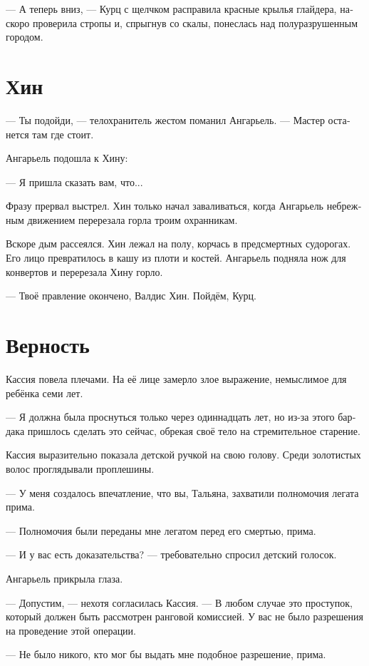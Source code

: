 \documentclass[a4paper,12pt,fleqn]{book}\usepackage{cooltooltips}\usepackage{polyglossia}\setdefaultlanguage[babelshorthands=true]{russian}\setotherlanguage{english}\defaultfontfeatures{Ligatures=TeX,Mapping=tex-text} \usepackage{xcolor}\definecolor{lightgray}{HTML}{bbbbbb}\color{lightgray}\newcommand{\ml}[3]{\textenglish{\textcolor{black}{#3}}}
\begin{document}
--- А теперь вниз, --- Курц с щелчком расправила красные крылья глайдера, наскоро проверила стропы и, спрыгнув со скалы, понеслась над полуразрушенным городом.

\section{Хин}

--- Ты подойди, --- телохранитель жестом поманил Ангарьель.
--- Мастер останется там где стоит.

Ангарьель подошла к Хину:

--- Я пришла сказать вам, что...

Фразу прервал выстрел.
Хин только начал заваливаться, когда Ангарьель небрежным движением перерезала горла троим охранникам.

Вскоре дым рассеялся.
Хин лежал на полу, корчась в предсмертных судорогах.
Его лицо превратилось в кашу из плоти и костей.
Ангарьель подняла нож для конвертов и перерезала Хину горло.

--- Твоё правление окончено, Валдис Хин.
Пойдём, Курц.

\section{Верность}

Кассия повела плечами.
На её лице замерло злое выражение, немыслимое для ребёнка семи лет.

--- Я должна была проснуться только через одиннадцать лет, но из-за этого бардака пришлось сделать это сейчас, обрекая своё тело на стремительное старение.

Кассия выразительно показала детской ручкой на свою голову.
Среди золотистых волос проглядывали проплешины.

--- У меня создалось впечатление, что вы, Тальяна, захватили полномочия легата прима.

--- Полномочия были переданы мне легатом перед его смертью, прима.

--- И у вас есть доказательства? --- требовательно спросил детский голосок.

Ангарьель прикрыла глаза.

--- Допустим, --- нехотя согласилась Кассия.
--- В любом случае это проступок, который должен быть рассмотрен ранговой комиссией.
У вас не было разрешения на проведение этой операции.

--- Не было никого, кто мог бы выдать мне подобное разрешение, прима.
\end{document}
